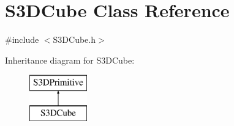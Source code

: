 \hypertarget{class_s3_d_cube}{
\section{S3DCube Class Reference}
\label{class_s3_d_cube}
}


{\ttfamily \#include $<$S3DCube.h$>$}

Inheritance diagram for S3DCube:\begin{figure}[H]
\begin{center}
\leavevmode
\includegraphics[height=2cm]{class_s3_d_cube}
\end{center}
\end{figure}
